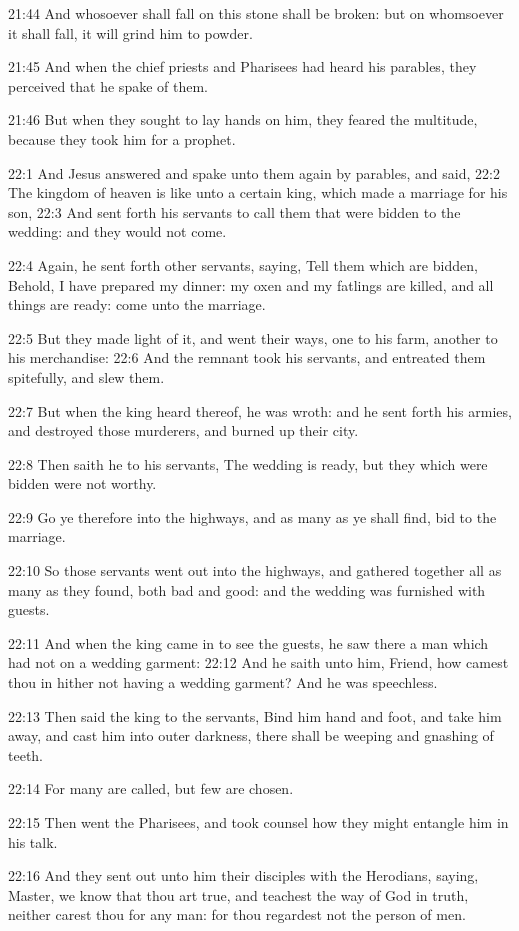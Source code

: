 21:44 And whosoever shall fall on this stone shall be broken: but on whomsoever it shall fall, it will grind him to powder.

21:45 And when the chief priests and Pharisees had heard his parables, they perceived that he spake of them.

21:46 But when they sought to lay hands on him, they feared the multitude, because they took him for a prophet.

22:1 And Jesus answered and spake unto them again by parables, and said, 22:2 The kingdom of heaven is like unto a certain king, which made a marriage for his son, 22:3 And sent forth his servants to call them that were bidden to the wedding: and they would not come.

22:4 Again, he sent forth other servants, saying, Tell them which are bidden, Behold, I have prepared my dinner: my oxen and my fatlings are killed, and all things are ready: come unto the marriage.

22:5 But they made light of it, and went their ways, one to his farm, another to his merchandise: 22:6 And the remnant took his servants, and entreated them spitefully, and slew them.

22:7 But when the king heard thereof, he was wroth: and he sent forth his armies, and destroyed those murderers, and burned up their city.

22:8 Then saith he to his servants, The wedding is ready, but they which were bidden were not worthy.

22:9 Go ye therefore into the highways, and as many as ye shall find, bid to the marriage.

22:10 So those servants went out into the highways, and gathered together all as many as they found, both bad and good: and the wedding was furnished with guests.

22:11 And when the king came in to see the guests, he saw there a man which had not on a wedding garment: 22:12 And he saith unto him, Friend, how camest thou in hither not having a wedding garment? And he was speechless.

22:13 Then said the king to the servants, Bind him hand and foot, and take him away, and cast him into outer darkness, there shall be weeping and gnashing of teeth.

22:14 For many are called, but few are chosen.

22:15 Then went the Pharisees, and took counsel how they might entangle him in his talk.

22:16 And they sent out unto him their disciples with the Herodians, saying, Master, we know that thou art true, and teachest the way of God in truth, neither carest thou for any man: for thou regardest not the person of men.

